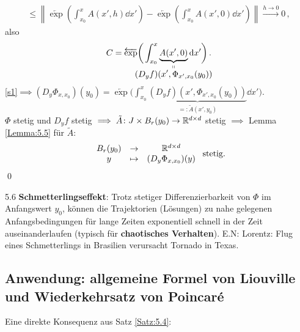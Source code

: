\documentclass[a4paper]{article}
\begin{document}
\begin{Beweis}
\begin{align*}
\le \left\|\overleftarrow{\exp}\left(\int_{x_0}^xA(x',h)\dd x'\right)-\overleftarrow{\exp}\left(\int_{x_0}^xA(x',0)\dd x'\right)\right\|\xrightarrow{h\to0}0\,,
\end{align*}
also 
\[C=\overleftarrow{\exp}\bigg(\int_{x_0}^x\underbrace{A(x',0)}_{\mathclap{\substack{\shortparallel\\\displaystyle (D_yf)(x',\Phi_{x',x_0}(y_0))}}}\dd x'\bigg)\,.\]
\eqref{s1}$\implies (D_y\Phi_{x,x_0})(y_0)=\overleftarrow{\exp}\big(\int_{x_0}^x\underbrace{(D_yf)(x',\Phi_{x',x_0}(y_0))}_{=:\tilde{A}(x',y_0)}\dd x'\big)$.\\
 $\Phi$ stetig und $D_yf$ stetig $\implies \tilde{A}\colon J\times B_r(y_0)\to \mathbb R^{d\times d}$ stetig $\implies$ Lemma \ref{Lemma:5.5} für $\tilde{A}$: 
 \[\begin{array}{clc}
B_r(y_0)&\to&\mathbb R^{d\times d}\\
y&\mapsto&(D_y\Phi_{x,x_0})(y)
\end{array}\text{ stetig.}\]\qed
\end{Beweis}

\begin{Bemerkung}{}{5.6}
\textbf{Schmetterlingseffekt}: Trotz stetiger Differenzierbarkeit von $\Phi$ im Anfangswert $y_0$, können die Trajektorien (Lösungen) zu nahe gelegenen Anfangsbedingungen für lange Zeiten exponentiell schnell in der Zeit auseinanderlaufen (typisch für \textbf{chaotisches Verhalten}). E.N: Lorentz: \glqq Flug eines Schmetterlings in Brasilien verursacht Tornado in Texas.\grqq
\end{Bemerkung}

\subsection{Anwendung: allgemeine Formel von Liouville und Wiederkehrsatz von Poincar\'e}
Eine direkte Konsequenz aus Satz \ref{Satz:5.4}:
\end{document}

